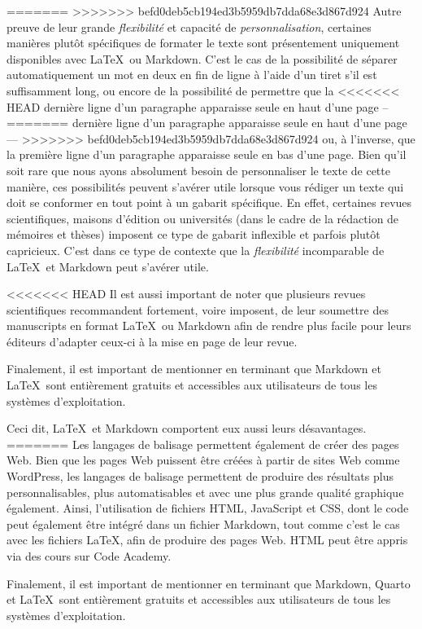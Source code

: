 \documentclass[
  letterpaper,
]{scrbook}
\begin{document}
=======
>>>>>>> befd0deb5cb194ed3b5959db7dda68e3d867d924
Autre preuve de leur grande \emph{flexibilité} et capacité de
\emph{personnalisation}, certaines manières plutôt spécifiques de
formater le texte sont présentement uniquement disponibles avec
\LaTeX~ou Markdown. C'est le cas de la possibilité de séparer
automatiquement un mot en deux en fin de ligne à l'aide d'un tiret s'il
est suffisamment long, ou encore de la possibilité de permettre que la
<<<<<<< HEAD
dernière ligne d'un paragraphe apparaisse seule en haut d'une page --
=======
dernière ligne d'un paragraphe apparaisse seule en haut d'une page ---
>>>>>>> befd0deb5cb194ed3b5959db7dda68e3d867d924
ou, à l'inverse, que la première ligne d'un paragraphe apparaisse seule
en bas d'une page. Bien qu'il soit rare que nous ayons absolument besoin
de personnaliser le texte de cette manière, ces possibilités peuvent
s'avérer utile lorsque vous rédiger un texte qui doit se conformer en
tout point à un gabarit spécifique. En effet, certaines revues
scientifiques, maisons d'édition ou universités (dans le cadre de la
rédaction de mémoires et thèses) imposent ce type de gabarit inflexible
et parfois plutôt capricieux. C'est dans ce type de contexte que la
\emph{flexibilité} incomparable de \LaTeX~et Markdown peut s'avérer
utile.

<<<<<<< HEAD
Il est aussi important de noter que plusieurs revues scientifiques
recommandent fortement, voire imposent, de leur soumettre des
manuscripts en format \LaTeX~ou Markdown afin de rendre plus facile pour
leurs éditeurs d'adapter ceux-ci à la mise en page de leur revue.

Finalement, il est important de mentionner en terminant que Markdown et
\LaTeX~sont entièrement gratuits et accessibles aux utilisateurs de tous
les systèmes d'exploitation.

Ceci dit, \LaTeX~et Markdown comportent eux aussi leurs désavantages.
=======
Les langages de balisage permettent également de créer des pages Web.
Bien que les pages Web puissent être créées à partir de sites Web comme
WordPress, les langages de balisage permettent de produire des résultats
plus personnalisables, plus automatisables et avec une plus grande
qualité graphique également. Ainsi, l'utilisation de fichiers HTML,
JavaScript et CSS, dont le code peut également être intégré dans un
fichier Markdown, tout comme c'est le cas avec les fichiers \LaTeX, afin
de produire des pages Web. HTML peut être appris via des cours sur Code
Academy.

Finalement, il est important de mentionner en terminant que Markdown,
Quarto et \LaTeX~sont entièrement gratuits et accessibles aux
utilisateurs de tous les systèmes d'exploitation.
\end{document}
